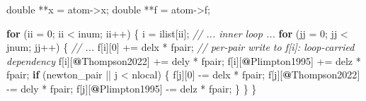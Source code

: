 \documentclass[
  11pt,
]{article}
\newenvironment{Shaded}{}{}
\newcommand{\CommentTok}[1]{\textcolor[rgb]{0.38,0.63,0.69}{\textit{#1}}}
\newcommand{\ControlFlowTok}[1]{\textcolor[rgb]{0.00,0.44,0.13}{\textbf{#1}}}
\newcommand{\DataTypeTok}[1]{\textcolor[rgb]{0.56,0.13,0.00}{#1}}
\newcommand{\DecValTok}[1]{\textcolor[rgb]{0.25,0.63,0.44}{#1}}
\newcommand{\ErrorTok}[1]{\textcolor[rgb]{1.00,0.00,0.00}{\textbf{#1}}}
\newcommand{\NormalTok}[1]{#1}
\newcommand{\OperatorTok}[1]{\textcolor[rgb]{0.40,0.40,0.40}{#1}}
\begin{document}
\begin{Shaded}
\begin{Highlighting}[]
\DataTypeTok{double} \OperatorTok{**}\NormalTok{x }\OperatorTok{=}\NormalTok{ atom}\OperatorTok{{-}\textgreater{}}\NormalTok{x}\OperatorTok{;}
\DataTypeTok{double} \OperatorTok{**}\NormalTok{f }\OperatorTok{=}\NormalTok{ atom}\OperatorTok{{-}\textgreater{}}\NormalTok{f}\OperatorTok{;}

\ControlFlowTok{for} \OperatorTok{(}\NormalTok{ii }\OperatorTok{=} \DecValTok{0}\OperatorTok{;}\NormalTok{ ii }\OperatorTok{\textless{}}\NormalTok{ inum}\OperatorTok{;}\NormalTok{ ii}\OperatorTok{++)} \OperatorTok{\{}
\NormalTok{  i }\OperatorTok{=}\NormalTok{ ilist}\OperatorTok{[}\NormalTok{ii}\OperatorTok{];}
  \CommentTok{// ... inner loop ...}
  \ControlFlowTok{for} \OperatorTok{(}\NormalTok{jj }\OperatorTok{=} \DecValTok{0}\OperatorTok{;}\NormalTok{ jj }\OperatorTok{\textless{}}\NormalTok{ jnum}\OperatorTok{;}\NormalTok{ jj}\OperatorTok{++)} \OperatorTok{\{}
    \CommentTok{// ...}
\NormalTok{    f}\OperatorTok{[}\NormalTok{i}\OperatorTok{][}\DecValTok{0}\OperatorTok{]} \OperatorTok{+=}\NormalTok{ delx }\OperatorTok{*}\NormalTok{ fpair}\OperatorTok{;}   \CommentTok{// per{-}pair write to f[i]: loop{-}carried dependency}
\NormalTok{    f}\OperatorTok{[}\NormalTok{i}\OperatorTok{][}\ErrorTok{@}\NormalTok{Thompson2022}\OperatorTok{]} \OperatorTok{+=}\NormalTok{ dely }\OperatorTok{*}\NormalTok{ fpair}\OperatorTok{;}
\NormalTok{    f}\OperatorTok{[}\NormalTok{i}\OperatorTok{][}\ErrorTok{@}\NormalTok{Plimpton1995}\OperatorTok{]} \OperatorTok{+=}\NormalTok{ delz }\OperatorTok{*}\NormalTok{ fpair}\OperatorTok{;}
    \ControlFlowTok{if} \OperatorTok{(}\NormalTok{newton\_pair }\OperatorTok{||}\NormalTok{ j }\OperatorTok{\textless{}}\NormalTok{ nlocal}\OperatorTok{)} \OperatorTok{\{}
\NormalTok{      f}\OperatorTok{[}\NormalTok{j}\OperatorTok{][}\DecValTok{0}\OperatorTok{]} \OperatorTok{{-}=}\NormalTok{ delx }\OperatorTok{*}\NormalTok{ fpair}\OperatorTok{;}
\NormalTok{      f}\OperatorTok{[}\NormalTok{j}\OperatorTok{][}\ErrorTok{@}\NormalTok{Thompson2022}\OperatorTok{]} \OperatorTok{{-}=}\NormalTok{ dely }\OperatorTok{*}\NormalTok{ fpair}\OperatorTok{;}
\NormalTok{      f}\OperatorTok{[}\NormalTok{j}\OperatorTok{][}\ErrorTok{@}\NormalTok{Plimpton1995}\OperatorTok{]} \OperatorTok{{-}=}\NormalTok{ delz }\OperatorTok{*}\NormalTok{ fpair}\OperatorTok{;}
    \OperatorTok{\}}
  \OperatorTok{\}}
\OperatorTok{\}}
\end{Highlighting}
\end{Shaded}
\end{document}
